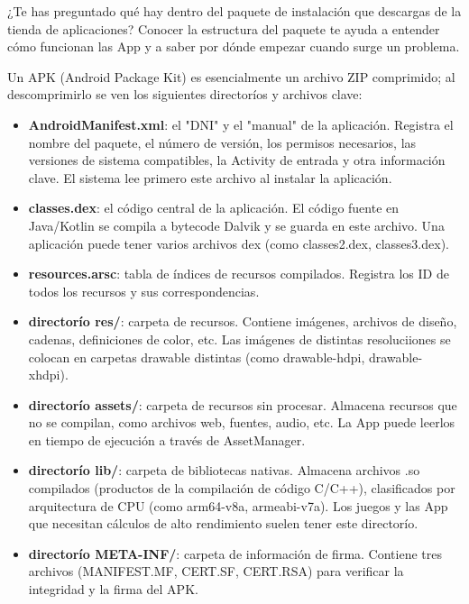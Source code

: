 
¿Te has preguntado qué hay dentro del paquete de instalación que descargas de la tienda de aplicaciones? Conocer la estructura del paquete te ayuda a entender cómo funcionan las App y a saber por dónde empezar cuando surge un problema.


Un APK (Android Package Kit) es esencialmente un archivo ZIP comprimido; al descomprimirlo se ven los siguientes directoríos y archivos clave:

\begin{itemize}
  \item \textbf{AndroidManifest.xml}: el "DNI" y el "manual" de la aplicación. Registra el nombre del paquete, el número de versión, los permisos necesarios, las versiones de sistema compatibles, la Activity de entrada y otra información clave. El sistema lee primero este archivo al instalar la aplicación.
  \item \textbf{classes.dex}: el código central de la aplicación. El código fuente en Java/Kotlin se compila a bytecode Dalvik y se guarda en este archivo. Una aplicación puede tener varios archivos dex (como classes2.dex, classes3.dex).
  \item \textbf{resources.arsc}: tabla de índices de recursos compilados. Registra los ID de todos los recursos y sus correspondencias.
  \item \textbf{directorío res/}: carpeta de recursos. Contiene imágenes, archivos de diseño, cadenas, definiciones de color, etc. Las imágenes de distintas resoluciiones se colocan en carpetas drawable distintas (como drawable-hdpi, drawable-xhdpi).
  \item \textbf{directorío assets/}: carpeta de recursos sin procesar. Almacena recursos que no se compilan, como archivos web, fuentes, audio, etc. La App puede leerlos en tiempo de ejecución a través de AssetManager.
  \item \textbf{directorío lib/}: carpeta de bibliotecas nativas. Almacena archivos .so compilados (productos de la compilación de código C/C++), clasificados por arquitectura de CPU (como arm64-v8a, armeabi-v7a). Los juegos y las App que necesitan cálculos de alto rendimiento suelen tener este directorío.
  \item \textbf{directorío META-INF/}: carpeta de información de firma. Contiene tres archivos (MANIFEST.MF, CERT.SF, CERT.RSA) para verificar la integridad y la firma del APK.
\end{itemize}

